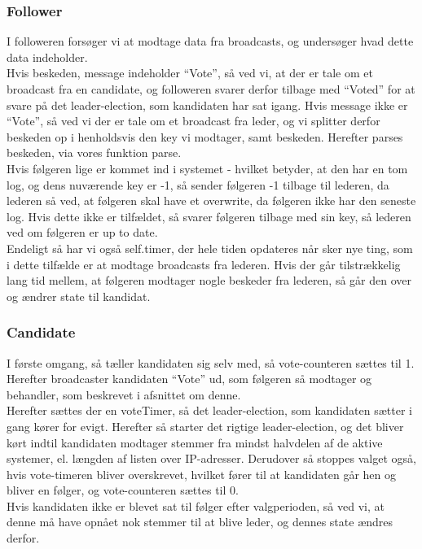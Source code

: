 \documentclass[a4paper,12pt]{article}
\begin{document}
\subsubsection{Follower}
I followeren forsøger vi at modtage data fra broadcasts, og undersøger hvad dette data indeholder.
\\
Hvis beskeden, message indeholder “Vote”, så ved vi, at der er tale om et broadcast fra en candidate, og followeren svarer derfor tilbage med “Voted” for at svare på det leader-election, som kandidaten har sat igang.
Hvis message ikke er “Vote”, så ved vi der er tale om et broadcast fra leder, og vi splitter derfor beskeden op i henholdsvis den key vi modtager, samt beskeden.
Herefter parses beskeden, via vores funktion parse.
\\
Hvis følgeren lige er kommet ind i systemet - hvilket betyder, at den har en tom log, og dens nuværende key er -1, så sender følgeren -1 tilbage til lederen, da lederen så ved, at følgeren skal have et overwrite, da følgeren ikke har den seneste log.
Hvis dette ikke er tilfældet, så svarer følgeren tilbage med sin key, så lederen ved om følgeren er up to date.
\\[5px]
Endeligt så har vi også self.timer, der hele tiden opdateres når sker nye ting, som i dette tilfælde er at modtage broadcasts fra lederen.
Hvis der går tilstrækkelig lang tid mellem, at følgeren modtager nogle beskeder fra lederen, så går den over og ændrer state til kandidat.


\subsubsection{Candidate}
I første omgang, så tæller kandidaten sig selv med, så vote-counteren sættes til 1.
Herefter broadcaster kandidaten “Vote” ud, som følgeren så modtager og behandler, som beskrevet i afsnittet om denne.
\\
Herefter sættes der en voteTimer, så det leader-election, som kandidaten sætter i gang kører for evigt.
Herefter så starter det rigtige leader-election, og det bliver kørt indtil kandidaten modtager stemmer fra mindst halvdelen af de aktive systemer, el. længden af listen over IP-adresser. Derudover så stoppes valget også, hvis vote-timeren bliver overskrevet, hvilket fører til at kandidaten går hen og bliver en følger, og vote-counteren sættes til 0.
\\
Hvis kandidaten ikke er blevet sat til følger efter valgperioden, så ved vi, at denne må have opnået nok stemmer til at blive leder, og dennes state ændres derfor.
\end{document}
